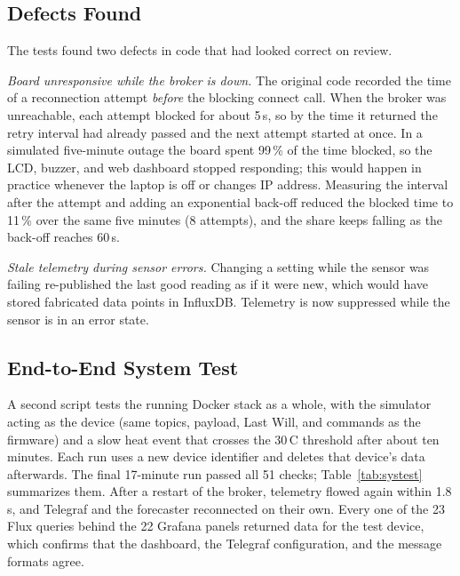 \documentclass[conference]{IEEEtran}
\begin{document}
\subsection{Defects Found}
\label{sec:bugs}
The tests found two defects in code that had looked correct on review.

\emph{Board unresponsive while the broker is down.} The original code recorded the time
of a reconnection attempt \emph{before} the blocking connect call. When the broker was
unreachable, each attempt blocked for about 5\,s, so by the time it returned the retry
interval had already passed and the next attempt started at once. In a simulated
five-minute outage the board spent 99\,\% of the time blocked, so the LCD, buzzer, and
web dashboard stopped responding; this would happen in practice whenever the laptop is
off or changes IP address. Measuring the interval after the attempt and adding an
exponential back-off reduced the blocked time to 11\,\% over the same five minutes
(8 attempts), and the share keeps falling as the back-off reaches 60\,s.

\emph{Stale telemetry during sensor errors.} Changing a setting while the sensor was
failing re-published the last good reading as if it were new, which would have
stored fabricated data points in InfluxDB. Telemetry is now suppressed while the sensor
is in an error state.

\subsection{End-to-End System Test}
\label{sec:systest}
A second script tests the running Docker stack as a whole, with the simulator acting as the
device (same topics, payload, Last Will, and commands as the firmware) and a slow heat
event that crosses the 30\,\textdegree C threshold after about ten minutes. Each run uses a new
device identifier and deletes that device's data afterwards. The final 17-minute run passed
all 51 checks; Table~\ref{tab:systest} summarizes them. After a restart of the broker,
telemetry flowed again within 1.8\,s, and Telegraf and the forecaster reconnected on their
own. Every one of the 23 Flux queries behind the 22 Grafana panels returned data for the test
device, which confirms that the dashboard, the Telegraf configuration, and the message
formats agree.
\end{document}
